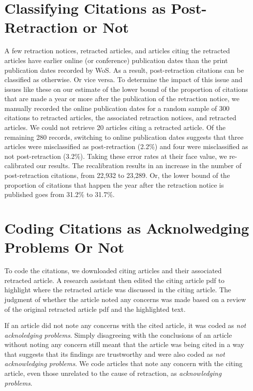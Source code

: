 \documentclass[12pt, letterpaper]{article}
\begin{document}
\section{Classifying Citations as Post-Retraction or Not}
\label{code_pre_post}
A few retraction notices, retracted articles, and articles citing the retracted articles have earlier online (or conference) publication dates than the print publication dates recorded by WoS. As a result, post-retraction citations can be classified as otherwise. Or vice versa. To determine the impact of this issue and issues like these on our estimate of the lower bound of the proportion of citations that are made a year or more after the publication of the retraction notice, we manually recorded the online publication dates for a random sample of 300 citations to retracted articles, the associated retraction notices, and retracted articles. We could not retrieve 20 articles citing a retracted article.  Of the remaining 280 records, switching to online publication dates suggests that three articles were misclassified as post-retraction (2.2\%) and four were misclassified as not post-retraction (3.2\%). Taking these error rates at their face value, we re-calibrated our results. The recalibration results in an increase in the number of post-retraction citations, from 22,932 to 23,289. Or, the lower bound of the proportion of citations that happen the year after the retraction notice is published goes from 31.2\% to 31.7\%.

\section{Coding Citations as Acknolwedging Problems Or Not}
\label{approving_or_not}
To code the citations, we downloaded citing articles and their associated retracted article. A research assistant then edited the citing article pdf to highlight where the retracted article was discussed in the citing article. The judgment of whether the article noted any concerns was made based on a review of the original retracted article pdf and the highlighted text. 

If an article did not note any concerns with the cited article, it was coded as \textit{not acknoledging problems}. Simply disagreeing with the conclusions of an article without noting any concern still meant that the article was being cited in a way that suggests that its findings are trustworthy and were also coded as \textit{not acknowledging problems}. We code articles that note any concern with the citing article, even those unrelated to the cause of retraction, as \textit{acknowledging problems}. 
\end{document}
